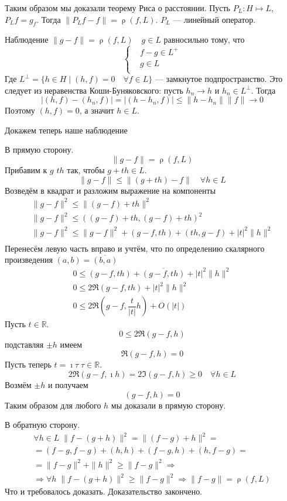 \documentclass[14pt]{extarticle}
\DeclareMathOperator{\rh}{\rho}
\begin{document}
Таким образом мы доказали теорему Риса о расстоянии.
Пусть $P_L : H \mapsto L$, $P_L f = g_f$.
Тогда $\|P_Lf - f\| = \rh(f, L)$. $P_L$ --- линейный оператор.
\begin{MathCl}{Наблюдение}
	$\|g - f\| = \rh(f, L)\quad g \in L$ равносильно тому, что 
	$$
	\left\{
		\begin{aligned}
			&f - g \in L^{+}\\
        	&g \in L\\
    	\end{aligned}
	\right.
	$$
	Где $L^\perp = \{h \in H \mid (h, f) = 0 \quad \forall f \in L\}$ --- замкнутое подпространство.
	Это следует из неравенства Коши-Буняковского: пусть $h_n \to h$ и $h_n \in L^\perp$.
	Тогда
	$$
	|(h, f) - (h_n, f)| = |(h - h_n, f)| \le \|h - h_n\| \|f\|\to 0
	$$
	Поэтому $(h, f)=0$, а значит $h \in L$.
\end{MathCl}
Докажем теперь наше наблюдение
\begin{Proof}
    В прямую сторону.
    $$
    \|g - f\| = \rh(f, L)
    $$
    Прибавим к $g$ $th$ так, чтобы $g + th \in L$.
    $$
    \|g - f\| \le \|(g + t h) - f\| \quad \forall h \in L
    $$
    Возведём в квадрат и разложим выражение на компоненты
    \begin{gather*}
        \|g - f\|^2 \le \|(g - f) + t h\|^2\\
        \|g - f\|^2 \le ((g - f) + t h, (g - f) + t h)^2\\
        \|g - f\|^2 \le \|g - f\|^2 + (g - f, t h) + (t h, g - f) + |t|^2 \|h\|^2\\
	\end{gather*}
	Перенесём левую часть вправо и учтём, что по определению скалярного произведения $(a, b) = \overline{(b, a)}$
	\begin{gather*}
        0 \le (g - f, t h) + \overline{(g - f, t h)} + |t|^2 \|h\|^2\\ 
        0 \le 2\Re(g - f,t h) + |t|^2 \|h\|^2\\
        0 \le 2\Re(g - f, \dfrac{t}{|t|} h) + O(|t|)
	\end{gather*}
    Пусть $t \in \mathbb R$.
    $$
    0 \le 2\Re(g - f, h)
    $$
    подставляя $\pm h$ имеем
    $$
    \Re(g - f, h) = 0
    $$
    Пусть теперь $t = \imath \tau\; \tau \in \mathbb R$.
    $$
    2\Re(g - f, \imath h) = 2\Im(g - f, h) \ge 0\quad\forall h \in L
    $$
    Возмём $\pm h$ и получаем
    $$
    (g - f, h) = 0
    $$
    Таким образом для любого $h$ мы доказали в прямую сторону.
    
    В обратную сторону.
    \begin{multline*}
    \forall h \in L\;\|f - (g + h)\|^2 = \|(f - g) + h\|^2 =\\
     = (f - g, f - g) + (h, h) + (f - g, h) + (h, f - g) =\\
    = \|f - g\|^2+\|h\|^2 \ge \|f - g\|^2 \Rightarrow \\
    \Rightarrow \forall h\;\|f - (g + h)\|^2 \ge \|f - g\|^2 \Rightarrow \|f - g\| = \rh(f, L)
    \end{multline*}
    Что и требовалось доказать.
    Доказательство закончено.
\end{Proof}
\end{document}
